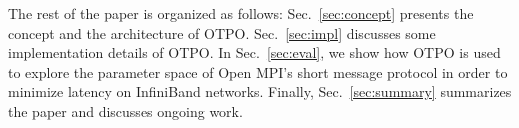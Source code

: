 The rest of the paper is organized as follows: Sec.~\ref{sec:concept}
presents the concept and the architecture of OTPO. 
Sec.~\ref{sec:impl} discusses some implementation details
of OTPO. In Sec.~\ref{sec:eval}, we show how OTPO is used to explore the
parameter space of Open MPI's short message protocol in order to
minimize latency on InfiniBand networks. Finally,
Sec.~\ref{sec:summary} summarizes the paper and discusses ongoing work.

